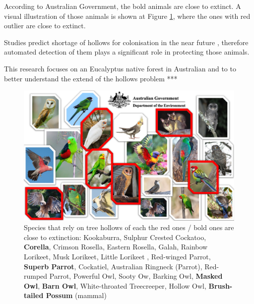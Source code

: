 \documentclass{subfiles}
\begin{document}
According to Australian Government, the bold animals are close to extinct. A visual illustration of those animals is shown at Figure \ref{fig:Birds}, where the ones with red outlier are close to extinct.  


Studies predict shortage of hollows for colonisation in the near future \cite{Lindenmayer2010} \cite{Goldingay2009}, therefore automated detection of them plays a significant role in protecting those animals.\par This research focuses on an Eucalyptus native forest in Australian and to to better understand the extend of the hollows problem ***




\newpage
    \begin{figure} [h!]
    	\centering
    	\includegraphics[width=\textwidth]{img/Birds}
    	\caption[Animals Closes to Exctinction]{Species that rely on tree hollows of each the red ones / bold ones are close to extinction: Kookaburra, Sulphur Crested Cockatoo, \textbf{Corella},  Crimson Rosella, Eastern Rosella,  Galah, Rainbow Lorikeet,  Musk Lorikeet, Little Lorikeet , Red-winged Parrot,  \textbf{Superb Parrot}, Cockatiel,   Australian Ringneck (Parrot),  Red-rumped Parrot,   Powerful Owl,    Sooty Ow,        Barking Owl, \textbf{Masked Owl},  \textbf{Barn Owl},  White-throated Treecreeper, Hollow Owl, \textbf{Brush-tailed Possum} (mammal) \footnotemark}
    	\label{fig:Birds}
    \end{figure}
        
\end{document}
